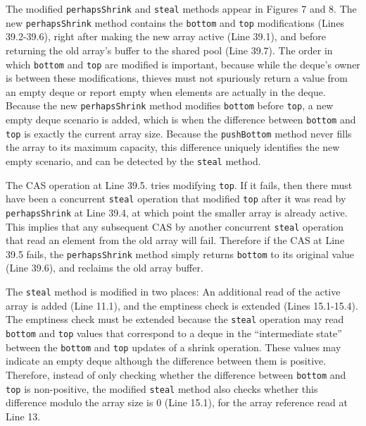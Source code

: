 The modified \lstinline!perhapsShrink! and \lstinline!steal! methods
appear in Figures 7 and 8. The new \lstinline!perhapsShrink! method
contains the \lstinline!bottom! and \lstinline!top! modifications
(Lines 39.2-39.6), right after making the new array active (Line
39.1), and before returning the old array's buffer to the shared pool
(Line 39.7). The order in which \lstinline!bottom! and \lstinline!top!
are modified is important, because while the deque's owner is
between these modifications, thieves must not spuriously return a
value from an empty deque or report empty when elements are actually
in the deque. Because the new \lstinline!perhapsShrink! method
modifies \lstinline!bottom! before \lstinline!top!, a new empty deque
scenario is added, which is when the difference between
\lstinline!bottom! and \lstinline!top! is exactly the current array
size. Because the \lstinline!pushBottom! method never fills the array
to its maximum capacity, this difference uniquely identifies the new
empty scenario, and can be detected by the \lstinline!steal! method.

The CAS operation at Line 39.5. tries modifying \lstinline!top!. If it
fails, then there must have been a concurrent \lstinline!steal!
operation that modified \lstinline!top! after it was read by
\lstinline!perhapsShrink! at Line 39.4, at which point the smaller
array is already active. This implies that any subsequent CAS by
another concurrent \lstinline!steal! operation that read an element
from the old array will fail. Therefore if the CAS at Line 39.5 fails,
the \lstinline!perhapsShrink! method simply returns \lstinline!bottom!
to its original value (Line 39.6), and reclaims the old array buffer.

The \lstinline!steal! method is modified in two places: An additional
read of the active array is added (Line 11.1), and the emptiness check
is extended (Lines 15.1-15.4). The emptiness check must be extended
because the \lstinline!steal! operation may read \lstinline!bottom!
and \lstinline!top! values that correspond to a deque in the
``intermediate state'' between the \lstinline!bottom! and
\lstinline!top! updates of a shrink operation. These values may
indicate an empty deque although the difference between them is
positive. Therefore, instead of only checking whether the difference
between \lstinline!bottom! and \lstinline!top! is non-positive, the
modified \lstinline!steal! method also checks whether this difference
modulo the array size is 0 (Line 15.1), for the array reference read
at Line 13.

